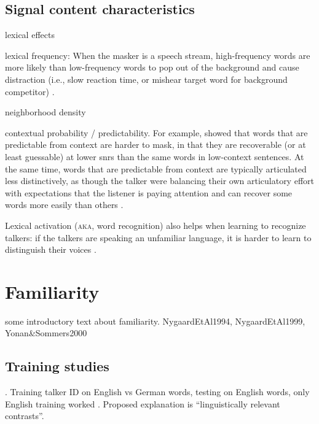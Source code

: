 \subsection{Signal content characteristics}
\begin{itm}
	\item{lexical effects \citep{HoenEtAl2007, BoulengerEtAl2010, BrouwerEtAl2012}}
	\item{lexical frequency: When the masker is a speech stream, high-frequency words are more likely than low-frequency words to pop out of the background and cause distraction (i.e., slow reaction time, or mishear target word for background competitor) \citep{BoulengerEtAl2010}.}
	\item{neighborhood density}
	\item{contextual probability / predictability.  For example, \citet{LewisEtAl1988} showed that words that are predictable from context are harder to mask, in that they are recoverable (or at least guessable) at lower \ac{snr}s than the same words in low-context sentences.  At the same time, words that are predictable from context are typically articulated less distinctively, as though the talker were balancing their own articulatory effort with expectations that the listener is paying attention and can recover some words more easily than others \citep{Wright2004}.  }
	\item{Lexical activation (\textsc{aka}, word recognition) also helps when learning to recognize talkers: if the talkers are speaking an unfamiliar language, it is harder to learn to distinguish their voices \citep{PerrachioneWong2007}.}
\end{itm}




\section{Familiarity}
some introductory text about familiarity.  NygaardEtAl1994, NygaardEtAl1999, Yonan\&Sommers2000

\subsection{Training studies\label{sec:Training}}
\citep{VanEngen2012}.  
Training talker ID on English vs German words, testing on English words, only English training worked \citep{LeviEtAl2011}.  Proposed explanation is “linguistically relevant contrasts”.

